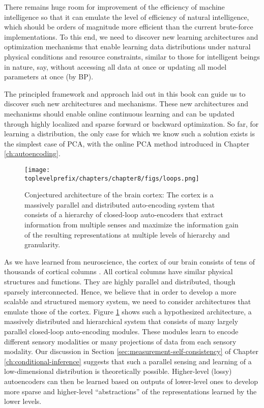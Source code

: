 \documentclass[../../book-main.tex]{subfiles}
\begin{document}
There remains huge room for improvement of the efficiency of machine intelligence so that it can emulate the level of efficiency of natural intelligence, which should be orders of magnitude more efficient than the current brute-force implementations. To this end, we need to discover new learning architectures and optimization mechanisms that enable learning data distributions under natural physical conditions and resource constraints, similar to those for intelligent beings in nature, say, without accessing all data at once or updating all model parameters at once (by BP). 

The principled framework and approach laid out in this book can guide us to discover such new architectures and mechanisms.  These new architectures and mechanisms should enable online continuous learning and can be updated through highly localized and sparse forward or backward optimization. So far, for learning a distribution, the only case for which we know such a solution exists is the simplest case of PCA, with the online PCA method introduced in Chapter \ref{ch:autoencoding}.  

\begin{figure}[t]
\centering
\texttt{[image: \\toplevelprefix/chapters/chapter8/figs/loops.png]}
    \caption{Conjectured architecture of the brain cortex: The cortex is a massively parallel and distributed auto-encoding system that consists of a hierarchy of closed-loop auto-encoders that extract information from multiple senses and maximize the information  gain of the resulting representations at multiple levels of hierarchy and granularity.}
    \label{fig:loops}
\end{figure}
As we have learned from neuroscience, the cortex of our brain consists of tens of thousands of cortical columns \cite{Hawkins-2021}. All cortical columns have similar physical structures and functions. They are highly parallel and distributed, though sparsely interconnected. Hence, we believe that in order to develop a more scalable and structured memory system, we need to consider architectures that emulate those of the cortex. Figure \ref{fig:loops} shows such a hypothesized architecture, a massively distributed and hierarchical system that consists of many largely parallel closed-loop auto-encoding modules. These modules learn to encode different sensory modalities or many projections of data from each sensory modality. Our discussion in Section \ref{sec:measurement-self-consistency} of Chapter \ref{ch:conditional-inference} suggests that such a parallel sensing and learning of a low-dimensional distribution is theoretically possible. Higher-level (lossy) autoencoders can then be learned based on outputs of lower-level ones to develop more sparse and higher-level ``abstractions'' of the representations learned by the lower levels. 
\end{document}
